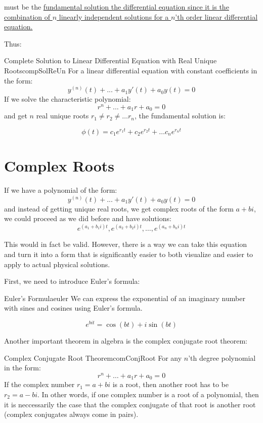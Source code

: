 \documentclass{report}
\begin{document}
must be the \hyperref[th:EqLinInd]{fundamental solution the differential equation since it is the combination of $n$ linearly independent solutions for a $n$'th order linear differential equation.}

Thus:

\begin{mytheo}{Complete Solution to Linear Differential Equation with Real Unique Roots}{compSolReUn}
    For a linear differential equation with constant coefficients in the form:
    $$y^{(n)}(t) + ... + a_1y'(t) + a_0y(t) = 0$$
    If we solve the characteristic polynomial:
    $$r^n+\dots+a_1r+a_0=0$$
    and get $n$ real unique roots $r_1 \neq r_2 \neq \dots r_n$, the fundamental solution is:
    
    $$\phi(t) = c_1e^{r_1t}+c_2e^{r_2t}+\dots c_ne^{r_nt}$$

\end{mytheo}


\section{Complex Roots}
If we have a polynomial of the form:
$$y^{(n)}(t) + ... + a_1y'(t) + a_0y(t) = 0$$
and instead of getting unique real roots, we get complex roots of the form $a+bi$, we could proceed as we did before and have solutions:
$$e^{(a_1+b_1i)t}, e^{(a_2+b_2i)t}, \dots, e^{(a_n+b_ni)t}$$

This would in fact be valid. However, there is a way we can take this equation and turn it into a form that is significantly easier to both visualize and easier to apply to actual physical solutions.

First, we need to introduce Euler's formula:

\begin{mytheo}{Euler's Formula}{euler}
    We can express the exponential of an imaginary number with sines and cosines using Euler's formula.
    
    $$e^{bit} = \cos(bt) + i\sin(bt)$$
\end{mytheo}

Another important theorem in algebra is the complex conjugate root theorem:

\begin{mytheo}{Complex Conjugate Root Theorem}{comConjRoot}
    For any $n$'th degree polynomial in the form:
    $$r^n+\dots+a_1r+a_0=0$$
    If the complex number $r_1=a+bi$ is a root, then another root has to be $r_2 = a-bi$. 
    In other words, if one complex number is a root of a polynomial, then it is neccessarily the case that the complex conjugate of that root is another root (complex conjugates always come in pairs).
\end{mytheo}
\end{document}
